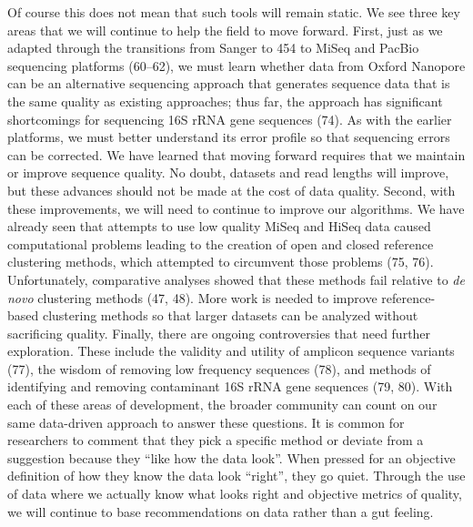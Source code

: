 \documentclass[11pt,]{article}
\begin{document}
Of course this does not mean that such tools will remain static. We see
three key areas that we will continue to help the field to move forward.
First, just as we adapted through the transitions from Sanger to 454 to
MiSeq and PacBio sequencing platforms (60--62), we must learn whether
data from Oxford Nanopore can be an alternative sequencing approach that
generates sequence data that is the same quality as existing approaches;
thus far, the approach has significant shortcomings for sequencing 16S
rRNA gene sequences (74). As with the earlier platforms, we must better
understand its error profile so that sequencing errors can be corrected.
We have learned that moving forward requires that we maintain or improve
sequence quality. No doubt, datasets and read lengths will improve, but
these advances should not be made at the cost of data quality. Second,
with these improvements, we will need to continue to improve our
algorithms. We have already seen that attempts to use low quality MiSeq
and HiSeq data caused computational problems leading to the creation of
open and closed reference clustering methods, which attempted to
circumvent those problems (75, 76). Unfortunately, comparative analyses
showed that these methods fail relative to \emph{de novo} clustering
methods (47, 48). More work is needed to improve reference-based
clustering methods so that larger datasets can be analyzed without
sacrificing quality. Finally, there are ongoing controversies that need
further exploration. These include the validity and utility of amplicon
sequence variants (77), the wisdom of removing low frequency sequences
(78), and methods of identifying and removing contaminant 16S rRNA gene
sequences (79, 80). With each of these areas of development, the broader
community can count on our same data-driven approach to answer these
questions. It is common for researchers to comment that they pick a
specific method or deviate from a suggestion because they ``like how the
data look''. When pressed for an objective definition of how they know
the data look ``right'', they go quiet. Through the use of data where we
actually know what looks right and objective metrics of quality, we will
continue to base recommendations on data rather than a gut feeling.
\end{document}
